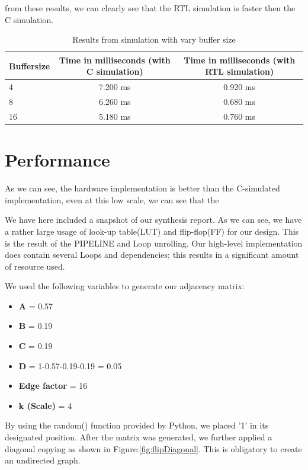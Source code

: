 from these results, we can clearly see that the RTL simulation is faster then the C simulation.
\begin{table}[]
\centering
\caption{Results from simulation with vary buffer size}
\label{ta:Vary buffer size}
\begin{tabular}{|l|c|c|}
\hline
Buffersize & Time in milliseconds (with C simulation) & Time in milliseconds (with RTL simulation)\\ \hline
 4  &         7.200 ms            &     0.920 ms \\ \hline
 8  &         6.260 ms            &     0.680 ms     \\ \hline
 16    &          5.180 ms            &     0.760 ms     \\
\hline
\end{tabular}
\end{table}

\section{Performance}
As we can see, the hardware implementation is better than the C-simulated implementation, even at this low scale, we can see that the



We have here included a snapshot of our synthesis report. As we can see, we have a rather large usage of look-up table(LUT) and flip-flop(FF) for our design. This is the result of the PIPELINE and Loop unrolling. Our high-level implementation does contain several Loops and dependencies; this results in a significant amount of resource used. 

We used the following variables to generate our adjacency matrix:
\begin{itemize}
\item \textbf{A} = 0.57
\item \textbf{B} = 0.19
\item \textbf{C} = 0.19
\item \textbf{D} = 1-0.57-0.19-0.19 = 0.05
\item \textbf{Edge factor}  = 16
\item \textbf{k (Scale)} = 4
\end{itemize}

By using the random() function provided by Python, we placed '1' in its designated position. After the matrix was generated, we further applied a diagonal copying as shown in Figure:\ref{fig:flipDiagonal}. This is obligatory to create an undirected graph.

